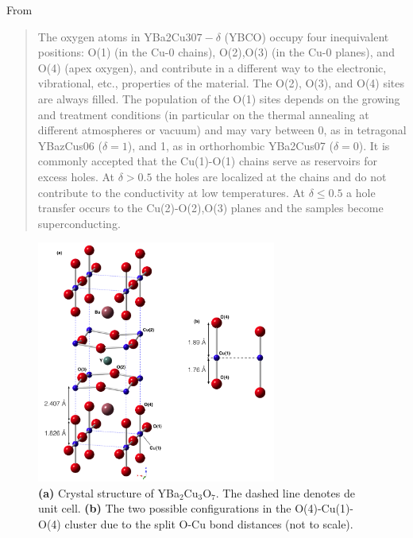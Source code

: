 From \cite{Ivanov1995}
\begin{quote}
The oxygen atoms in YBa2Cu30$7-\delta$ (YBCO) occupy four inequivalent positions: O(1) (in the Cu-0 chains), O(2),O(3)
(in the Cu-0 planes), and O(4) (apex oxygen), and contribute in a different way to the electronic, vibrational, etc., properties of the material. 
The O(2), O(3), and O(4) sites are always filled. 
The population of the O(1) sites depends on the growing and treatment conditions (in particular on the thermal annealing at different atmospheres or vacuum) and may vary between 0, as in tetragonal YBazCus06 ($\delta=1$), and 1, as in orthorhombic YBa2Cus07 ($\delta=0$).
It is commonly accepted that the Cu(1)-O(1) chains serve as reservoirs for excess holes. 
At $\delta > 0.5$ the holes are localized at the chains and do not contribute to the conductivity at low temperatures. 
At $\delta \leq 0.5$ a hole transfer occurs to the Cu(2)-O(2),O(3) planes and the samples become superconducting.
\end{quote}

\begin{figure}[ht]
  \centering
  \includegraphics[width=0.7\textwidth]{images/YBCO_O-Cu-O.jpg}
  \caption[Crystal structure of YBa$_{2}$Cu$_{3}$O$_{7}$ and the two possible O(4)-Cu(1)-O(4) configurations.]
  {\textbf{(a)} Crystal structure of YBa$_{2}$Cu$_{3}$O$_{7}$. The dashed line denotes de unit cell. \textbf{(b)} The two possible configurations in the O(4)-Cu(1)-O(4) cluster due to the split O-Cu bond distances (not to scale).}
\label{fig:YBCO_structure}
\end{figure}


